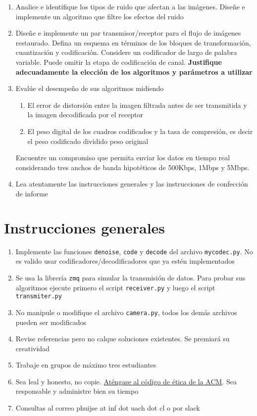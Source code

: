 \documentclass[11pt,letterpaper,spanish,oneside]{article}
\begin{document}
\begin{enumerate}
    \item Analice e identifique los tipos de ruido que afectan a las imágenes. Diseñe e implemente un algoritmo que filtre los efectos del ruido
    \item Diseñe e implemente un par transmisor/receptor para el flujo de imágenes restaurado. Defina un esquema en términos de los bloques de transformación, cuantización y codificación. Considere un codificador de largo de palabra variable. Puede omitir la etapa de codificación de canal. \textbf{Justifique adecuadamente la elección de los algoritmos y parámetros a utilizar}
    \item Evalúe el desempeño de sus algoritmos midiendo 
    \begin{enumerate}
        \item El error de distorsión entre la imagen filtrada antes de ser transmitida y la imagen decodificada por el receptor
        \item El peso digital de los cuadros codificados y la tasa de compresión, es decir el peso codificado dividido peso original
    \end{enumerate} 
    Encuentre un compromiso que permita enviar los datos en tiempo real considerando tres anchos de banda hipotéticos de 500Kbps, 1Mbps y 5Mbps. 
    \item Lea atentamente las instrucciones generales y las instrucciones de confección de informe
\end{enumerate}


\newpage

\section*{Instrucciones generales}

\begin{enumerate}[noitemsep,topsep=0pt]
    \item Implemente las funciones \texttt{denoise}, \texttt{code} y \texttt{decode} del archivo \texttt{mycodec.py}. No es valido usar codificadores/decodificadores que ya estén implementados
    \item Se usa la librería \texttt{zmq} para simular la transmisión de datos. Para probar sus algoritmos ejecute primero el script \texttt{receiver.py} y luego el script \texttt{transmiter.py}
    \item No manipule o modifique el archivo \texttt{camera.py}, todos los demás archivos pueden ser modificados
    \item Revise referencias pero no calque soluciones existentes. Se premiará su creatividad
    \item Trabaje en grupos de máximo tres estudiantes
    \item Sea leal y honesto, no copie. \href{https://www.acm.org/about-acm/code-of-ethics-in-spanish}{Aténgase al código de ética de la ACM}. Sea responsable y administre bien su tiempo
    \item Consultas al correo phuijse at inf dot uach dot cl o por slack
\end{enumerate}
\end{document}
